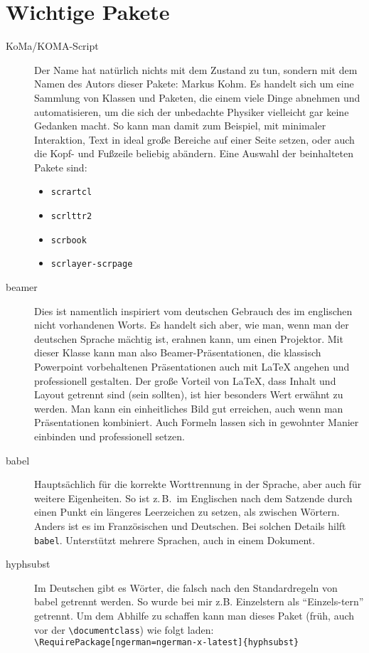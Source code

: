 \documentclass[11pt,
               a4paper,
               parskip=half,
               ]{scrartcl}
\newcommand{\zB}{z.\,B.\xspace}
\newcommand{\textsw}[1]{\texttt{#1}} %
\begin{document}
\section{Wichtige Pakete}
%
\begin{description}
  \item[KoMa/KOMA-Script] Der Name hat natürlich nichts mit dem Zustand zu tun,
    sondern mit dem Namen des Autors dieser Pakete: Markus Kohm.
    Es handelt sich um eine Sammlung von Klassen und Paketen,
    die einem viele Dinge abnehmen und automatisieren,
    um die sich der unbedachte Physiker
    vielleicht gar keine Gedanken macht.
    So kann man damit zum Beispiel, mit minimaler Interaktion,
    Text in ideal große Bereiche auf einer Seite setzen,
    oder auch die Kopf- und Fußzeile beliebig abändern.
    Eine Auswahl der beinhalteten Pakete sind:
    \begin{itemize}
      \item \textsw{scrartcl}
      \item \textsw{scrlttr2}
      \item \textsw{scrbook}
      \item \textsw{scrlayer-scrpage}
    \end{itemize}

  \item[beamer] Dies ist namentlich inspiriert vom deutschen Gebrauch
    des im englischen nicht vorhandenen Worts. Es handelt sich aber,
    wie man, wenn man der deutschen Sprache mächtig ist, erahnen kann,
    um einen Projektor.
    Mit dieser Klasse kann man also Beamer-Präsentationen,
    die klassisch Powerpoint vorbehaltenen Präsentationen
    auch mit \LaTeX{} angehen und professionell gestalten.
    Der große Vorteil von \LaTeX,
    dass Inhalt und Layout getrennt sind (sein sollten),
    ist hier besonders Wert erwähnt zu werden.
    Man kann ein einheitliches Bild gut erreichen,
    auch wenn man Präsentationen kombiniert.
    Auch Formeln lassen sich in gewohnter Manier einbinden
    und professionell setzen.

  \item[babel] Hauptsächlich für die korrekte Worttrennung in der Sprache,
    aber auch für weitere Eigenheiten.
    So ist \zB~im Englischen nach dem Satzende durch einen Punkt
    ein längeres Leerzeichen zu setzen, als zwischen Wörtern.
    Anders ist es im Französischen und Deutschen.
    Bei solchen Details hilft \textsw{babel}.
    Unterstützt mehrere Sprachen, auch in einem Dokument.

  \item[hyphsubst] Im Deutschen gibt es Wörter,
    die falsch nach den Standardregeln von babel getrennt werden.
    So wurde bei mir z.B. Einzelstern als \enquote{Einzels-tern} getrennt.
    Um dem Abhilfe zu schaffen kann man dieses Paket
    (früh, auch vor der \verb+\documentclass+) wie folgt laden:
    \verb+\RequirePackage[ngerman=ngerman-x-latest]{hyphsubst}+


\end{description}
\end{document}
